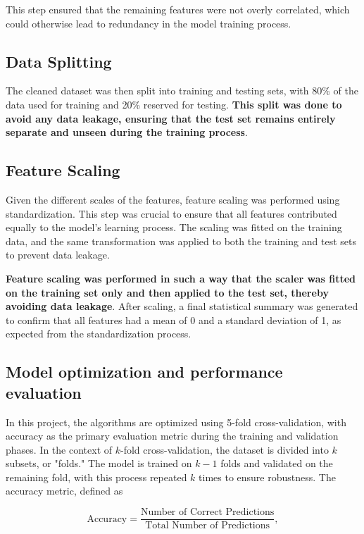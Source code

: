\documentclass[a4paper, 10pt]{article}
\begin{document}
This step ensured that the remaining features were not overly correlated, which could otherwise lead to redundancy in the model training process.

\subsection{Data Splitting}

The cleaned dataset was then split into training and testing sets, with 80\% of the data used for training and 20\% reserved for testing. \textbf{This split was done to avoid any data leakage, ensuring that the test set remains entirely separate and unseen during the training process}.



\subsection{Feature Scaling}

Given the different scales of the features, feature scaling was performed using standardization. This step was crucial to ensure that all features contributed equally to the model's learning process.
The scaling was fitted on the training data, and the same transformation was applied to both the training and test sets to prevent data leakage.




\textbf{Feature scaling was performed in such a way that the scaler was fitted on the training set only and then applied to the test set, thereby avoiding data leakage}. After scaling, a final statistical summary was generated to confirm that all features had a mean of 0 and a standard deviation of 1, as expected from the standardization process.

\subsection{Model optimization and performance evaluation}
In this project, the algorithms are optimized using 5-fold cross-validation, with accuracy as the primary evaluation metric during the training and validation phases. In the context of \(k\)-fold cross-validation, the dataset is divided into \(k\) subsets, or "folds." The model is trained on \(k-1\) folds and validated on the remaining fold, with this process repeated \(k\) times to ensure robustness. The accuracy metric, defined as

\[
\text{Accuracy} = \frac{\text{Number of Correct Predictions}}{\text{Total Number of Predictions}},
\]
\end{document}

